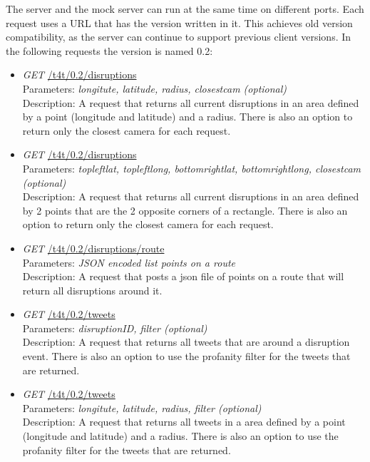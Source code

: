 The server and the mock server can run at the same time on different ports. Each request uses a URL that has the version written in it. This achieves old version compatibility, as the server can continue to support previous client versions. In the following requests the version is named 0.2:
\begin{itemize}
\item \emph{GET} \url{/t4t/0.2/disruptions} \\
Parameters: \emph{longitute, latitude, radius, closestcam (optional)} \\
Description: A request that returns all current disruptions in an area defined by a point (longitude and latitude) and a radius. There is also an option to return only the closest camera for each request.

\item \emph{GET} \url{/t4t/0.2/disruptions} \\
Parameters: \emph{topleftlat, topleftlong, bottomrightlat, bottomrightlong, closestcam (optional)} \\
Description: A request that returns all current disruptions in an area defined by 2 points that are the 2 opposite corners of a rectangle. There is also an option to return only the closest camera for each request.

\item \emph{GET} \url{/t4t/0.2/disruptions/route} \\
Parameters: \emph{JSON encoded list points on a route} \\
Description: A request that posts a json file of points on a route that will return all disruptions around it.

\item \emph{GET} \url{/t4t/0.2/tweets} \\
Parameters: \emph{disruptionID, filter (optional)} \\
Description: A request that returns all tweets that are around a disruption event. There is also an option to use the profanity filter for the tweets that are returned.

\item \emph{GET} \url{/t4t/0.2/tweets} \\
Parameters: \emph{longitute, latitude, radius, filter (optional)} \\
Description: A request that returns all tweets in a area defined by a point (longitude and latitude) and a radius. There is also an option to use the profanity filter for the tweets that are returned.


\end{itemize}
